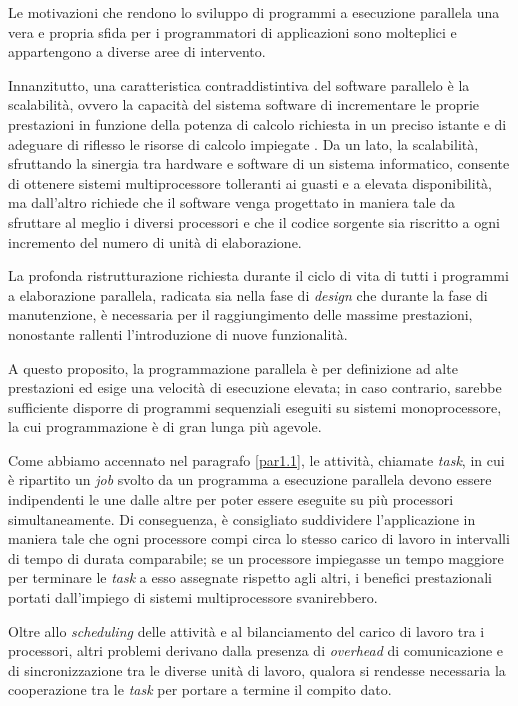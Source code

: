Le motivazioni che rendono lo sviluppo di programmi a esecuzione parallela una vera e propria sfida per i programmatori
di applicazioni sono molteplici e appartengono a diverse aree di intervento.

Innanzitutto, una caratteristica contraddistintiva del software parallelo
\`e la scalabilit\`a, ovvero la capacit\`a del sistema software di incrementare le proprie prestazioni in funzione della potenza
di calcolo richiesta in un preciso istante e di adeguare di riflesso le risorse di calcolo impiegate \cite{Michael2007}.\newline
Da un lato, la scalabilit\`a, sfruttando la sinergia tra hardware e software di un sistema informatico, consente di ottenere
sistemi multiprocessore tolleranti ai guasti e a elevata disponibilit\`a, ma dall'altro richiede che il software venga progettato
in maniera tale da sfruttare al meglio i diversi processori e che il codice sorgente sia riscritto a ogni
incremento del numero di unit\`a di elaborazione.

La profonda ristrutturazione richiesta durante il ciclo di vita di tutti i  programmi a elaborazione parallela, radicata sia nella
fase di \textit{design} che durante la fase di manutenzione, \`e necessaria per il raggiungimento delle massime prestazioni, nonostante rallenti l'introduzione di nuove funzionalit\`a.

A questo proposito, la programmazione parallela \`e per definizione ad alte prestazioni ed esige una
velocit\`a di esecuzione elevata; in caso contrario, sarebbe sufficiente disporre di programmi sequenziali eseguiti su sistemi monoprocessore, la cui programmazione \`e di gran lunga pi\`u agevole.

Come abbiamo accennato nel paragrafo \ref{par1.1}, le attivit\`a, chiamate \textit{task}, in cui \`e ripartito un \textit{job} svolto da un
programma a esecuzione parallela devono essere indipendenti le une dalle altre per poter essere eseguite su pi\`u processori simultaneamente.\newline
Di conseguenza, \`e consigliato suddividere l'applicazione in maniera tale che ogni processore compi circa lo stesso carico di lavoro in intervalli
di tempo di durata comparabile; se un processore impiegasse un tempo maggiore per terminare le \textit{task} a esso assegnate rispetto agli altri, i benefici prestazionali portati
dall'impiego di sistemi multiprocessore svanirebbero.

Oltre allo \textit{scheduling} delle attivit\`a e al bilanciamento del carico di lavoro tra i processori, altri problemi derivano dalla presenza di
\textit{overhead} di comunicazione e di sincronizzazione tra le diverse unit\`a di lavoro, qualora si rendesse necessaria la cooperazione tra le
\textit{task} per portare a termine il compito dato.

